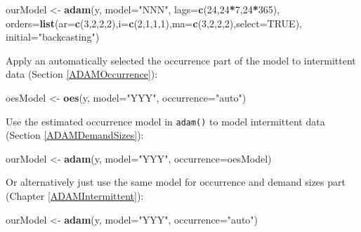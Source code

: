 \documentclass[]{book}
\newenvironment{Shaded}{\begin{snugshade}}{\end{snugshade}}
\newcommand{\DataTypeTok}[1]{\textcolor[rgb]{0.13,0.29,0.53}{#1}}
\newcommand{\DecValTok}[1]{\textcolor[rgb]{0.00,0.00,0.81}{#1}}
\newcommand{\KeywordTok}[1]{\textcolor[rgb]{0.13,0.29,0.53}{\textbf{#1}}}
\newcommand{\NormalTok}[1]{#1}
\newcommand{\OperatorTok}[1]{\textcolor[rgb]{0.81,0.36,0.00}{\textbf{#1}}}
\newcommand{\OtherTok}[1]{\textcolor[rgb]{0.56,0.35,0.01}{#1}}
\newcommand{\StringTok}[1]{\textcolor[rgb]{0.31,0.60,0.02}{#1}}
\theoremstyle{definition}
\theoremstyle{definition}
\theoremstyle{definition}
\theoremstyle{definition}
\theoremstyle{remark}
\begin{document}
\begin{Shaded}
\begin{Highlighting}[]
\NormalTok{ourModel <-}\StringTok{ }\KeywordTok{adam}\NormalTok{(y, }\DataTypeTok{model=}\StringTok{"NNN"}\NormalTok{, }\DataTypeTok{lags=}\KeywordTok{c}\NormalTok{(}\DecValTok{24}\NormalTok{,}\DecValTok{24}\OperatorTok{*}\DecValTok{7}\NormalTok{,}\DecValTok{24}\OperatorTok{*}\DecValTok{365}\NormalTok{),}
                 \DataTypeTok{orders=}\KeywordTok{list}\NormalTok{(}\DataTypeTok{ar=}\KeywordTok{c}\NormalTok{(}\DecValTok{3}\NormalTok{,}\DecValTok{2}\NormalTok{,}\DecValTok{2}\NormalTok{,}\DecValTok{2}\NormalTok{),}\DataTypeTok{i=}\KeywordTok{c}\NormalTok{(}\DecValTok{2}\NormalTok{,}\DecValTok{1}\NormalTok{,}\DecValTok{1}\NormalTok{,}\DecValTok{1}\NormalTok{),}\DataTypeTok{ma=}\KeywordTok{c}\NormalTok{(}\DecValTok{3}\NormalTok{,}\DecValTok{2}\NormalTok{,}\DecValTok{2}\NormalTok{,}\DecValTok{2}\NormalTok{),}\DataTypeTok{select=}\OtherTok{TRUE}\NormalTok{),}
                 \DataTypeTok{initial=}\StringTok{"backcasting"}\NormalTok{)}
\end{Highlighting}
\end{Shaded}

Apply an automatically selected the occurrence part of the model to intermittent data (Section \ref{ADAMOccurrence}):

\begin{Shaded}
\begin{Highlighting}[]
\NormalTok{oesModel <-}\StringTok{ }\KeywordTok{oes}\NormalTok{(y, }\DataTypeTok{model=}\StringTok{"YYY"}\NormalTok{, }\DataTypeTok{occurrence=}\StringTok{"auto"}\NormalTok{)}
\end{Highlighting}
\end{Shaded}

Use the estimated occurrence model in \texttt{adam()} to model intermittent data (Section \ref{ADAMDemandSizes}):

\begin{Shaded}
\begin{Highlighting}[]
\NormalTok{ourModel <-}\StringTok{ }\KeywordTok{adam}\NormalTok{(y, }\DataTypeTok{model=}\StringTok{"YYY"}\NormalTok{, }\DataTypeTok{occurrence=}\NormalTok{oesModel)}
\end{Highlighting}
\end{Shaded}

Or alternatively just use the same model for occurrence and demand sizes part (Chapter \ref{ADAMIntermittent}):

\begin{Shaded}
\begin{Highlighting}[]
\NormalTok{ourModel <-}\StringTok{ }\KeywordTok{adam}\NormalTok{(y, }\DataTypeTok{model=}\StringTok{"YYY"}\NormalTok{, }\DataTypeTok{occurrence=}\StringTok{"auto"}\NormalTok{)}
\end{Highlighting}
\end{Shaded}
\end{document}
